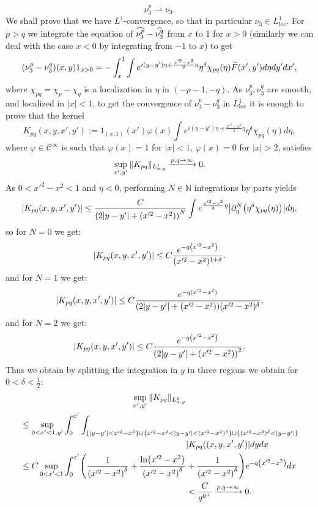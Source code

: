 \documentclass[10pt]{amsart}
\theoremstyle{definition}\newtheorem{defi}[theo]{Definition}\newtheorem{rema}[theo]{Remark}\newtheorem{exam}[theo]{Example}\newtheorem{exem}[theo]{Example}\newtheorem{nota}[theo]{Notation}
\DeclareMathOperator{\locc}{loc}
\newcommand{\bbN}{\mathbb{N}}
\newcommand{\clC}{\mathcal{C}}
\renewcommand*{\to}{\mathchoice{\longrightarrow}{\rightarrow}{\rightarrow}{\rightarrow}}
\let\originalleft\left
\let\originalright\right
\renewcommand{\left}{\mathopen{}\mathclose\bgroup\originalleft}
\renewcommand{\right}{\aftergroup\egroup\originalright}
\let\oldtilde\tilde
\renewcommand*{\tilde}[1]{\mathchoice{\widetilde{#1}}{\widetilde{#1}}{\oldtilde{#1}}{\oldtilde{#1}}}
\let\oldhat\hat
\renewcommand*{\hat}[1]{\mathchoice{\widehat{#1}}{\widehat{#1}}{\oldhat{#1}}{\oldhat{#1}}}
\begin{document}
\[
\nu_3^p\rightharpoonup\nu_3.
\]
We shall prove that we have $L^1$-convergence, so that in particular $\nu_3\in L^1_{\locc}$. For $p>q$ we integrate the equation of $\hat{\nu_3^p}-\hat{\nu_3^q}$ from $x$ to $1$ for $x>0$ (similarly we can deal with the case $x<0$ by integrating from $-1$ to $x$) to get
\[
\left(\nu_3^p-\nu_3^q\right)(x,y)1_{x>0}=-\int_x^1\int e^{i(y-y')\eta+\frac {x'^2-x^2}2\eta}\eta^\delta \chi_{pq}(\eta)\tilde F(x',y')d\eta dy'dx',
\]
where $\chi_{pq}=\chi_p-\chi_q$ is a localization in $\eta$ in $(-p-1,-q)$. As $\nu_3^p,\nu_3^q$ are smooth, and localized in $|x|<1$, to get the convergence of $\nu_3^p-\nu_3^q$ in $L^1_{\locc}$ it is enough to prove that the kernel
\[
K_{pq}(x,y,x',y'):=1_{(x,1)}(x')\varphi(x)\int e^{i(y-y')\eta+\frac {x'^2-x^2}2\eta}\eta^\delta\chi_{pq}(\eta)d\eta,
\]
where $\varphi\in\clC^\infty$ is such that $\varphi(x)=1$ for $|x|<1$, $\varphi(x)=0$ for $|x|>2$, satisfies
\[
\sup_{x',y'}\|K_{pq}\|_{L^1_{x,y}}\xrightarrow{p,q\to\infty} 0.
\]
As $0<x'^2-x^2<1$ and $\eta<0$, performing $N\in\bbN$ integrations by parts yields
\[
\left|K_{pq}(x,y,x',y')\right|\leq \frac{C}{\left(2|y-y'|+(x'^2-x^2)\right)^N}\int e^{\frac {x'^2-x^2}2\eta}\left|\partial_\eta^N\left(\eta^\delta\chi_{pq}(\eta)\right)\right|d\eta,
\]
so for $N=0$ we get:
\[
\left|K_{pq}(x,y,x',y')\right|\leq C\frac{e^{-q\left(x'^2-x^2\right)}}{(x'^2-x^2)^{1+\delta}}.
\]
and for $N=1$ we get:
\[
\left|K_{pq}\left(x,y,x',y'\right)\right|\leq C\frac{e^{-q(x'^2-x^2)}}{\left(2|y-y'|+(x'^2-x^2)\right)(x'^2-x^2)^{\delta}},
\]
and for $N=2$ we get:
\[
\left|K_{pq}(x,y,x',y')\right|\leq C\frac{e^{-q\left(x'^2-x^2\right)}}{\left(2|y-y'|+(x'^2-x^2)\right)^2}.
\]
Thus we obtain by splitting the integration in $y$ in three regions we obtain for $0<\delta<\frac 12$:
\begin{multline}
\sup_{x',y'}\|K_{pq}\|_{L^1_{x,y}}\\
\begin{aligned}
&\leq \sup_{0<x'< 1,y'}\int_0^{x'}\int_{\left\{|y-y'|<x'^2-x^2\right\}
\cup\left\{x'^2-x^2<|y-y'|<(x'^2-x^2)^{\delta}\right\}\cup \left\{(x'^2-x^2)^{\delta}<|y-y'|\right\}}\\
& \mkern350mu |K_{pq}((x,y,x',y')|dydx
\\
&\leq C\sup_{0<x'< 1}\int_0^{x'}\left(\frac{1}{\left(x'^2-x^2\right)^{\delta}}
+\frac{\ln \left(x'^2-x^2\right)}{\left(x'^2-x^2\right)^{\delta}}+\frac{1}{\left(x'^2-x^2\right)^{\delta}}\right)e^{-q\left(x'^2-x^2\right)}dx\\
& \mkern350mu
<\frac{C}{q^{0^+}}\xrightarrow{p,q\to\infty} 0.
\end{aligned}
\end{multline}
\end{document}
